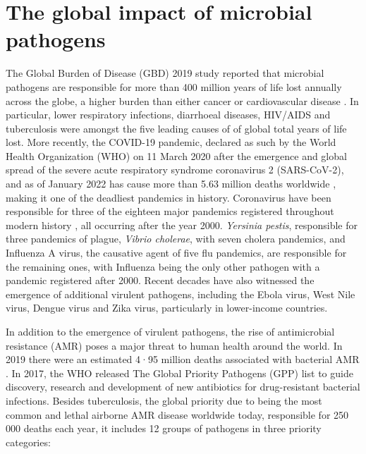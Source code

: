 \section{The global impact of microbial pathogens}

The Global Burden of Disease (GBD) 2019 study reported that microbial pathogens are responsible for more than 400 million years of life lost annually across the globe, a higher burden than either cancer or cardiovascular disease \citep{vos_global_2020}. In particular, lower respiratory infections, diarrhoeal diseases, HIV/AIDS and tuberculosis were amongst the five leading causes of of global total years of life lost. More recently, the COVID-19 pandemic, declared as such by the World Health Organization (WHO) on 11 March 2020 after the emergence and global spread of the severe acute respiratory syndrome coronavirus 2 (SARS-CoV-2), and as of January 2022 has cause more than 5.63 million deaths worldwide \citep{ritchie_coronavirus_2020}, making it one of the deadliest pandemics in history. Coronavirus have been responsible for three of the eighteen major pandemics registered throughout modern history \citep{piret_pandemics_2021}, all occurring after the year 2000. \textit{Yersinia pestis}, responsible for three pandemics of plague, \textit{Vibrio cholerae}, with seven cholera pandemics, and Influenza A virus, the causative agent of five flu pandemics, are responsible for the remaining ones, with Influenza being the only other pathogen with a pandemic registered after 2000. Recent decades have also witnessed the emergence of additional virulent pathogens, including the Ebola virus, West Nile virus, Dengue virus and Zika virus, particularly in lower-income countries.

In addition to the emergence of virulent pathogens, the rise of antimicrobial resistance (AMR) poses a major threat to human health around the world. In 2019 there were an estimated 4·95 million deaths associated with bacterial AMR \citep{murray_global_2022}. In 2017, the WHO released The Global Priority Pathogens (GPP) list \citep{world_health_organization_prioritization_2017} to guide discovery, research and development of new antibiotics for drug-resistant bacterial infections. Besides tuberculosis, the global priority due to being the most common and lethal airborne AMR disease worldwide today, responsible for 250 000 deaths each year, it includes 12 groups of pathogens in three priority categories: 

